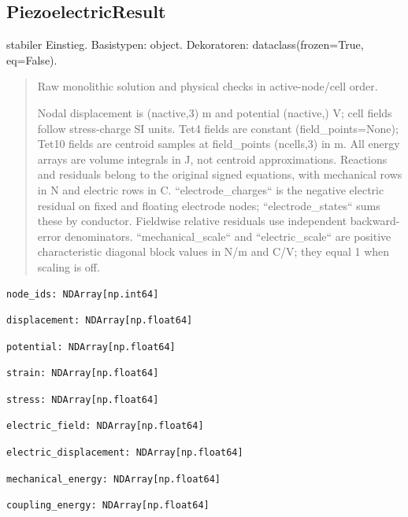 \subsection{PiezoelectricResult}
stabiler Einstieg.
Basistypen: object. Dekoratoren: dataclass(frozen=True, eq=False).
\begin{quote}
Raw monolithic solution and physical checks in active-node/cell order.\par Nodal displacement is (nactive,3) m and potential (nactive,) V; cell fields follow stress-charge SI units. Tet4 fields are constant (field\_points=None); Tet10 fields are centroid samples at field\_points (ncells,3) in m. All energy arrays are volume integrals in J, not centroid approximations. Reactions and residuals belong to the original signed equations, with mechanical rows in N and electric rows in C. ``electrode\_charges`` is the negative electric residual on fixed and floating electrode nodes; ``electrode\_states`` sums these by conductor. Fieldwise relative residuals use independent backward-error denominators. ``mechanical\_scale`` and ``electric\_scale`` are positive characteristic diagonal block values in N/m and C/V; they equal 1 when scaling is off.
\end{quote}
\begin{lstlisting}
node_ids: NDArray[np.int64]
\end{lstlisting}
\begin{lstlisting}
displacement: NDArray[np.float64]
\end{lstlisting}
\begin{lstlisting}
potential: NDArray[np.float64]
\end{lstlisting}
\begin{lstlisting}
strain: NDArray[np.float64]
\end{lstlisting}
\begin{lstlisting}
stress: NDArray[np.float64]
\end{lstlisting}
\begin{lstlisting}
electric_field: NDArray[np.float64]
\end{lstlisting}
\begin{lstlisting}
electric_displacement: NDArray[np.float64]
\end{lstlisting}
\begin{lstlisting}
mechanical_energy: NDArray[np.float64]
\end{lstlisting}
\begin{lstlisting}
coupling_energy: NDArray[np.float64]
\end{lstlisting}
